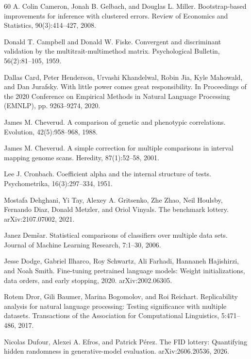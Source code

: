 \begin{thebibliography}{60}
A. Colin Cameron, Jonah B. Gelbach, and Douglas L. Miller. Bootstrap-based improvements for inference with clustered errors. Review of Economics and Statistics, 90(3):414--427, 2008.

Donald T. Campbell and Donald W. Fiske. Convergent and discriminant validation by the multitrait-multimethod matrix. Psychological Bulletin, 56(2):81--105, 1959.

Dallas Card, Peter Henderson, Urvashi Khandelwal, Robin Jia, Kyle Mahowald, and Dan Jurafsky. With little power comes great responsibility. In Proceedings of the 2020 Conference on Empirical Methods in Natural Language Processing (EMNLP), pp. 9263--9274, 2020.

James M. Cheverud. A comparison of genetic and phenotypic correlations. Evolution, 42(5):958--968, 1988.

James M. Cheverud. A simple correction for multiple comparisons in interval mapping genome scans. Heredity, 87(1):52--58, 2001.

Lee J. Cronbach. Coefficient alpha and the internal structure of tests. Psychometrika, 16(3):297--334, 1951.

Mostafa Dehghani, Yi Tay, Alexey A. Gritsenko, Zhe Zhao, Neil Houlsby, Fernando Diaz, Donald Metzler, and Oriol Vinyals. The benchmark lottery. arXiv:2107.07002, 2021.

Janez Dem\v{s}ar. Statistical comparisons of classifiers over multiple data sets. Journal of Machine Learning Research, 7:1--30, 2006.

Jesse Dodge, Gabriel Ilharco, Roy Schwartz, Ali Farhadi, Hannaneh Hajishirzi, and Noah Smith. Fine-tuning pretrained language models: Weight initializations, data orders, and early stopping, 2020. arXiv:2002.06305.

Rotem Dror, Gili Baumer, Marina Bogomolov, and Roi Reichart. Replicability analysis for natural language processing: Testing significance with multiple datasets. Transactions of the Association for Computational Linguistics, 5:471--486, 2017.

Nicolas Dufour, Alexei A. Efros, and Patrick P\'{e}rez. The FID lottery: Quantifying hidden randomness in generative-model evaluation. arXiv:2606.20536, 2026.


\end{thebibliography}
